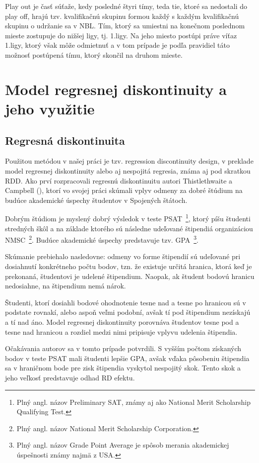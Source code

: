 \documentclass[
  digital, %
  oneside, %
  notable,   %
  lof,     %
  lot,     %
]{fithesis3}
\begin{document}
		Play out je časť súťaže, kedy posledné štyri tímy, teda tie, ktoré sa nedostali do play off, hrajú tzv. kvalifikačnú skupinu formou každý s každým kvalifikačnú skupinu o udržanie sa v NBL. Tím, ktorý sa umiestni na konečnom poslednom mieste zostupuje do nižšej ligy, tj. 1.ligy. Na jeho miesto postúpi práve víťaz 1.ligy, ktorý však môže odmietnuť a v tom prípade je podľa pravidiel táto možnosť postúpená tímu, ktorý skončil na druhom mieste. \parencite{bulletin2018}

	\chapter{Model regresnej diskontinuity a jeho využitie}
		\section{Regresná diskontinuita}
		Použitou metódou v našej práci je tzv. regression discontinuity design, v preklade model regresnej diskontinuity alebo aj nespojitá regresia, známa aj pod skratkou RDD. Ako prví rozpracovali regresnú diskontinuitu autori Thistlethwaite a Campbell (\citeyear{thist1960}), ktorí vo svojej práci skúmali vplyv odmeny za dobré štúdium na budúce akademické úspechy študentov v Spojených štátoch. 
		
		Dobrým štúdiom je myslený dobrý výsledok v teste PSAT~\footnote{Plný angl. názov Preliminary SAT, známy aj ako National Merit Scholarship Qualifying Test.}, ktorý píšu študenti stredných škôl a na základe ktorého sú následne udeľované štipendiá organizáciou NMSC~\footnote{Plný angl. názov National Merit Scholarship Corporation.}. Budúce akademické úspechy predstavuje tzv. GPA~\footnote{Plný angl. názov Grade Point Average je spôsob merania akademickej úspešnosti známy najmä z USA.}.
	
		Skúmanie prebiehalo nasledovne: odmeny vo forme štipendií sú udeľované pri dosiahnutí konkrétneho počtu bodov, tzn. že existuje určitá hranica, ktorá keď je prekonaná, študentovi je udelené štipendium. Naopak, ak študent bodovú hranicu nedosiahne, na štipendium nemá nárok. 
	
		Študenti, ktorí dosiahli bodové ohodnotenie tesne nad a tesne po hranicou sú v podstate rovnakí, alebo aspoň veľmi podobní, avšak tí pod štipendium nezískajú a tí nad áno. Model regresnej diskontinuity porovnáva študentov tesne pod a tesne nad hranicou a rozdiel medzi nimi pripisuje vplyvu udelenia štipendia. 
	
		Očakávania autorov sa v tomto prípade potvrdili. S vyšším počtom získaných bodov  v teste PSAT mali študenti lepšie GPA, avšak vďaka pôsobeniu štipendia sa v hraničnom bode pre zisk štipendia vyskytol nespojitý skok. Tento skok a jeho veľkosť predstavuje odhad RD efektu.
		
\end{document}
